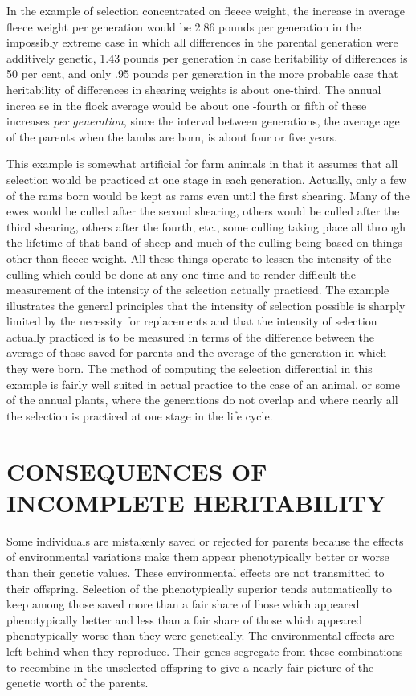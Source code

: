 In the example of selection concentrated on fleece weight, the
increase in average fleece weight per generation would be 2.86 pounds
per generation in the impossibly extreme case in which all differences in
the parental generation were additively genetic, 1.43 pounds per generation
in case heritability of differences is 50 per cent, and only .95
pounds per generation in the more probable case that heritability of
differences in shearing weights is about one-third. The annual increa se
in the flock average would be about one -fourth or fifth of these increases
\textit{per generation}, since the interval between generations, the average age
of the parents when the lambs are born, is about four or five years.

This example is somewhat artificial for farm animals in that it
assumes that all selection would be practiced at one stage in each generation.
Actually, only a few of the rams born would be kept as rams
even until the first shearing. Many of the ewes would be culled after the
second shearing, others would be culled after the third shearing, others
after the fourth, etc., some culling taking place all through the lifetime
of that band of sheep and much of the culling being based on things
other than fleece weight. All these things operate to lessen the intensity
of the culling which could be done at any one time and to render difficult
the measurement of the intensity of the selection actually practiced.
The example illustrates the general principles that the intensity
of selection possible is sharply limited by the necessity for replacements
and that the intensity of selection actually practiced is to be measured
in terms of the difference between the average of those saved for parents
and the average of the generation in which they were born. The
method of computing the selection differential in this example is fairly
well suited in actual practice to the case of an animal, or some of the
annual plants, where the generations do not overlap and where nearly
all the selection is practiced at one stage in the life cycle.
\nowidow

\section*{CONSEQUENCES OF INCOMPLETE HERITABILITY}

Some individuals are mistakenly saved or rejected for parents
because the effects of environmental variations make them appear
phenotypically better or worse than their genetic values. These environmental
effects are not transmitted to their offspring. Selection of the
phenotypically superior tends automatically to keep among those
saved more than a fair share of lhose which appeared phenotypically
better and less than a fair share of those which appeared phenotypically
worse than they were genetically. The environmental effects are left
behind when they reproduce. Their genes segregate from these combinations
to recombine in the unselected offspring to give a nearly fair
picture of the genetic worth of the parents.


